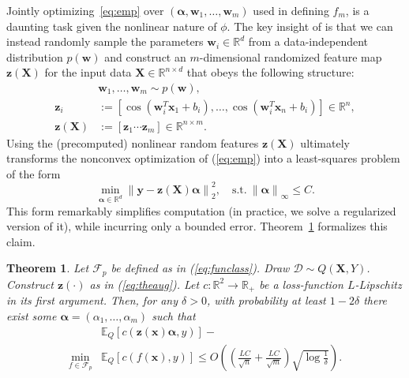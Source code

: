 \documentclass{article}
\newcommand{\E}{\mathbb{E}}
\newcommand{\norm}[1]{\left\|#1\right\|}
\newtheorem{theorem}{Theorem}
\begin{document}
  Jointly optimizing~\eqref{eq:emp} over $(\bm
  \alpha,\bm{w}_1,\ldots,\bm{w}_m)$ used in defining $f_m$,   is a daunting
  task given the nonlinear nature of $\phi$.  The key insight of
  \citet{Rahimi08} is that we can instead randomly sample the parameters $\bm
  w_i \in \mathbb{R}^{d}$ from a data-independent distribution $p(\bm w)$ and
  construct an $m$-dimensional randomized feature map $\bm z(\bm X)$ for the
  input data $\bm X \in \mathbb{R}^{n \times d}$ that obeys the following
  structure: 
  \begin{align}\label{eq:theaug}
    &\bm w_1, \ldots, \bm w_m \sim p(\bm w),\nonumber\\
    \bm z_i      &:= [\cos(\bm w_i^T\bm x_1 + b_i), \ldots, \cos(\bm w_i^T\bm
    x_n + b_i)]
    \in \mathbb{R}^{n},\nonumber\\
    \bm z(\bm X) &:=  \left[ \bm z_1 \cdots \bm z_m \right] \in \mathbb{R}^{n
    \times m}.
  \end{align}
  Using the (precomputed) nonlinear random features $\bm z(\bm X)$ ultimately
  transforms the nonconvex optimization of (\ref{eq:emp}) into a least-squares
  problem of the form
  \begin{equation}
    \label{eq:lsq}
    \min_{\bm \alpha \in \mathbb{R}^d} \nolimits \left\|\bm y-\bm 
    z(\bm X)\bm \alpha\right\|^2_2,\quad \text{s.t.}\ \norm{\bm
    \alpha}_{\infty} \le C.
  \end{equation}
  This form remarkably simplifies computation (in practice, we solve a
  regularized version of it), while incurring only a bounded error.
  Theorem~\ref{thm:rahimi} formalizes this claim.
  
  \begin{theorem}\label{thm:rahimi}
  \citep{Rahimi08} Let $\mathcal{F}_p$ be defined as in (\ref{eq:funclass}).
  Draw $\mathcal{D} \sim Q(\bm X,Y)$. Construct $\bm z(\cdot)$ as in
  (\ref{eq:theaug}). Let $c : \mathbb{R}^2 \rightarrow \mathbb{R}_+$ be a
  loss-function $L$-Lipschitz in its first argument.  Then, for any $\delta >
  0$, with probability at least $1-2\delta$ there exist some $\bm \alpha =
  (\alpha_1, \ldots, \alpha_m)$ such that
  \begin{align*}
   &\mathbb{E}_Q\left[c\left(\bm z(\bm x)\bm \alpha,y\right)\right]-\\
   \min_{f\in \mathcal{F}_p}&\E_Q[c(f(\bm x),y)]
   \leq O\left(\left( \tfrac{LC}{\sqrt{n}} +
   \tfrac{LC}{\sqrt{m}} \right) \sqrt{\log \tfrac{1}{\delta}}\right).
  \end{align*}
  \end{theorem}
\end{document}
